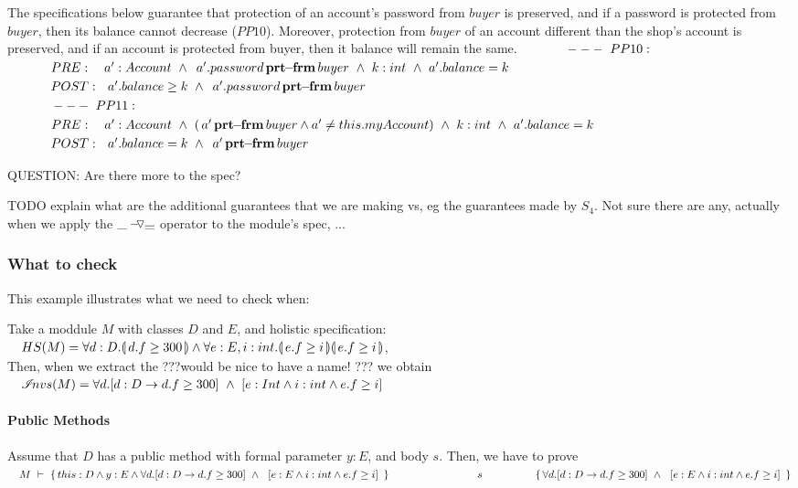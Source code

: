 The specifications below guarantee that protection of an account's password from $buyer$ is preserved, and if a password is protected from $buyer$, then its balance cannot decrease ($PP10$). Moreover, protection from $buyer$ of an account different than the shop's account is preserved, and if an account is protected from buyer, then it balance will remain the same.
\noindent
$~\strut \ \ \ \ \ \ \ \ \  ---\ PP10:$\\
$\SP PRE:\ \ \ a': Account \ \wedge \ \protectedFrom {a'.password}{buyer} \ \wedge \  k:int \ \wedge \ a'.balance=k$\\
$\SP POST: \ \ a'.balance \geq k \ \wedge\  \protectedFrom {a'.password}{buyer} $
\\
$~\strut \ \ \ \ \ \ \ \ \  ---\ PP11:$\\
$\SP PRE:\ \ \ a': Account \ \wedge \ (\protectedFrom {a'}{buyer} \wedge a'\neq this.myAccount) \ \wedge \  k:int \ \wedge \ a'.balance=k$\\
$\SP POST: \ \ a'.balance = k \ \wedge\  \protectedFrom {a'}{buyer} $

\vspace{.2cm}
QUESTION: Are there more to the spec? 

TODO explain what are the additional guarantees that we are making vs, eg the guarantees made by $S_4$. Not sure there are any, actually when we apply the $ {\_} -\!\!\!\,\!{\triangledown} \overline{\_} $ operator to the module's spec, ...

\subsubsection{What to check}
This example illustrates what we need to check when:

Take a moddule $M$ with classes $D$ and $E$, and holistic specification:\\
$\strut \ \ \  HS(M)= \forall {d:D}.{\llparenthesis}\, d.f\geq 300 \,{\rrparenthesis} \wedge  \forall {e:E,i:int}.{\llparenthesis}\, e.f\geq i \,{\rrparenthesis}{\llparenthesis}\, e.f\geq i \,{\rrparenthesis} $,\\
Then, when we extract the ???would be nice to have a name! ??? we obtain\\
$\strut \ \ \   {\mathcal I}\!nvs(M)  = \forall d.[d:D \rightarrow d.f\geq 300]\ \wedge \  [ e:Int \wedge i:int \wedge e.f \geq i]$

\paragraph{Public Methods}
Assume that $D$ has a public method  with formal parameter $y:E$, and body $s$. Then, we have to prove\\
$\strut \ \ \  \hprovesTwoLines {M} {this:D \wedge y:E \wedge  \forall d.[d:D \rightarrow d.f\geq 300]\ \wedge\  \  [ e:E \wedge i:int \wedge e.f \geq i]\ } {s}
{\forall d.[d:D \rightarrow d.f\geq 300]\ \wedge\  \  [ e:E \wedge i:int \wedge e.f \geq i]\ }$

